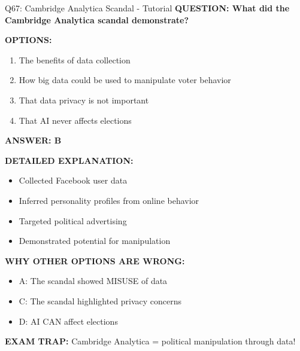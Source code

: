 \documentclass[8pt]{beamer}
\begin{document}
	\begin{frame}{Q67: Cambridge Analytica Scandal - Tutorial}
		\fontsize{6.5}{7.5}\selectfont
		\textbf{QUESTION: What did the Cambridge Analytica scandal demonstrate?}
		
		\vspace{0.1cm}
		\textbf{OPTIONS:}
		\begin{enumerate}
			\item The benefits of data collection
			\item How big data could be used to manipulate voter behavior
			\item That data privacy is not important
			\item That AI never affects elections
		\end{enumerate}
		
		\vspace{0.1cm}
		\textcolor{myblue}{\textbf{ANSWER: B}}
		
		\vspace{0.1cm}
		\textbf{DETAILED EXPLANATION:}
		\begin{itemize}
			\item Collected Facebook user data
			\item Inferred personality profiles from online behavior
			\item Targeted political advertising
			\item Demonstrated potential for manipulation
		\end{itemize}
		
		\vspace{0.1cm}
		\textcolor{myred}{\textbf{WHY OTHER OPTIONS ARE WRONG:}}
		\begin{itemize}
			\item \textcolor{myred}{A:} The scandal showed MISUSE of data
			\item \textcolor{myred}{C:} The scandal highlighted privacy concerns
			\item \textcolor{myred}{D:} AI CAN affect elections
		\end{itemize}
		
		\textcolor{myred}{\textbf{EXAM TRAP:}} Cambridge Analytica = \textcolor{myblue}{political manipulation through data}!
	\end{frame}
	
\end{document}
